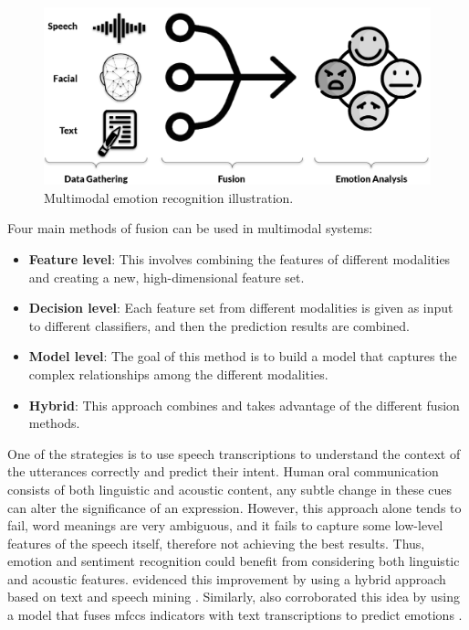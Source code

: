 \begin{figure}[h]
	\centering
	\includegraphics[width=.8\linewidth]{figs/2_state_of_the_art/multimodality.png}
	\caption{Multimodal emotion recognition illustration.}
	\label{fig:multimodal}
\end{figure}

Four main methods of fusion can be used in multimodal systems:
\begin{itemize}
	\item \textbf{Feature level}: This involves combining the features of different modalities and creating a new, high-dimensional feature set.
	
	\item \textbf{Decision level}: Each feature set from different modalities is given as input to different classifiers, and then the prediction results are combined.
	
	\item \textbf{Model level}: The goal of this method is to build a model that captures the complex relationships among the different modalities.
	
	\item \textbf{Hybrid}: This approach combines and takes advantage of the different fusion methods.
	
\end{itemize}

One of the strategies is to use speech transcriptions to understand the context of the utterances correctly and predict their intent. Human oral communication consists of both linguistic and acoustic content, any subtle change in these cues can alter the significance of an expression. However, this approach alone tends to fail, word meanings are very ambiguous, and it fails to capture some low-level features of the speech itself, therefore not achieving the best results. Thus, emotion and sentiment recognition could benefit from considering both linguistic and acoustic features. \citeauthor{BHASKAR2015635} evidenced this improvement by using a hybrid approach based on text and speech mining \cite{BHASKAR2015635}. Similarly, \citeauthor{ser_strategies} also corroborated this idea by using a model that fuses \ac{mfccs} indicators with text transcriptions to predict emotions \cite{ser_strategies}.

